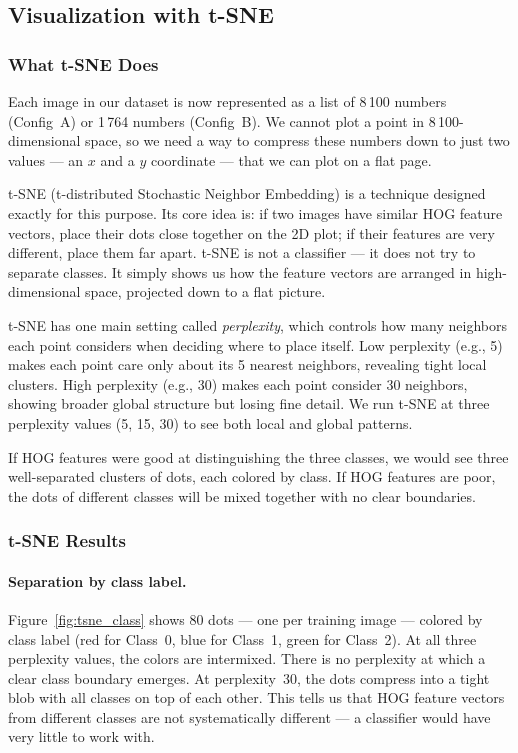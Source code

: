 \documentclass[a4paper,10pt]{article}
\begin{document}
\subsection{Visualization with t-SNE}

\subsubsection{What t-SNE Does}

Each image in our dataset is now represented as a list of 8\,100 numbers (Config~A) or 1\,764 numbers (Config~B).
We cannot plot a point in 8\,100-dimensional space, so we need a way to compress these numbers down to just two values --- an $x$ and a $y$ coordinate --- that we can plot on a flat page.

t-SNE (t-distributed Stochastic Neighbor Embedding) is a technique designed exactly for this purpose.
Its core idea is: if two images have similar HOG feature vectors, place their dots close together on the 2D plot; if their features are very different, place them far apart.
t-SNE is not a classifier --- it does not try to separate classes.
It simply shows us how the feature vectors are arranged in high-dimensional space, projected down to a flat picture.

t-SNE has one main setting called \textit{perplexity}, which controls how many neighbors each point considers when deciding where to place itself.
Low perplexity (e.g., 5) makes each point care only about its 5 nearest neighbors, revealing tight local clusters.
High perplexity (e.g., 30) makes each point consider 30 neighbors, showing broader global structure but losing fine detail.
We run t-SNE at three perplexity values (5, 15, 30) to see both local and global patterns.

If HOG features were good at distinguishing the three classes, we would see three well-separated clusters of dots, each colored by class.
If HOG features are poor, the dots of different classes will be mixed together with no clear boundaries.

\subsubsection{t-SNE Results}

\paragraph{Separation by class label.}
Figure~\ref{fig:tsne_class} shows 80 dots --- one per training image --- colored by class label (red for Class~0, blue for Class~1, green for Class~2).
At all three perplexity values, the colors are intermixed.
There is no perplexity at which a clear class boundary emerges.
At perplexity~30, the dots compress into a tight blob with all classes on top of each other.
This tells us that HOG feature vectors from different classes are not systematically different --- a classifier would have very little to work with.
\end{document}
